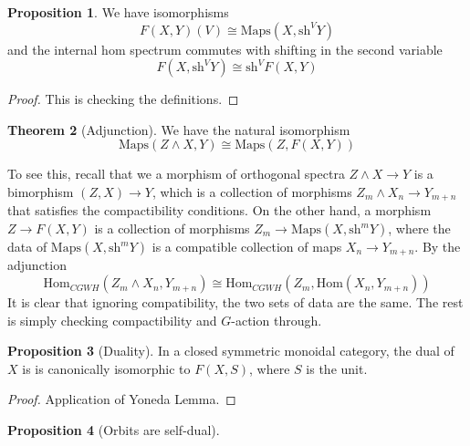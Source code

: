 \documentclass{article}
\theoremstyle{definition}
\newtheorem{theorem}{Theorem}[section] %
\newtheorem{proposition}[theorem]{Proposition}
\begin{document}
\begin{tcolorbox}[colback=blue!5!white,colframe=blue!30!white]
\begin{proposition}
We have isomorphisms 
\[F(X,Y)(V)\cong \textrm{Maps}(X, \textrm{sh}^VY)\]
and the internal hom spectrum commutes with shifting in the second variable
\[F(X,\textrm{sh}^VY)\cong \textrm{sh}^VF(X,Y)\]
\end{proposition}
\end{tcolorbox}
\begin{proof}
    This is checking the definitions.
\end{proof}


\begin{tcolorbox}[colback=red!5!white,colframe=red!30!white]
\begin{theorem}[Adjunction]
We have the natural isomorphism
\[\textrm{Maps}(Z\wedge X,Y)\cong \textrm{Maps}(Z, F(X,Y))\]
\end{theorem}
\end{tcolorbox}
To see this, recall that we a morphism of orthogonal spectra $Z\wedge X\to Y$ is a bimorphism $(Z,X)\to Y$, which is a collection of morphisms $Z_m\wedge X_n\to Y_{m+n}$ that satisfies the compactibility conditions. On the other hand, a morphism $Z\to F(X,Y)$ is a collection of morphisms $Z_m\to \textrm{Maps}(X,\textrm{sh}^mY)$, where the data of $\textrm{Maps}(X,\textrm{sh}^mY)$ is a compatible collection of maps $X_n\to Y_{m+n}$. By the adjunction $$\textrm{Hom}_{CGWH}(Z_m\wedge X_n,Y_{m+n})\cong \textrm{Hom}_{CGWH}(Z_m, \textrm{Hom}(X_n,Y_{m+n}))$$
It is clear that ignoring compatibility, the two sets of data are the same. The rest is simply checking compactibility and $G$-action through. 



\begin{tcolorbox}[colback=blue!5!white,colframe=blue!30!white]
\begin{proposition}[Duality]
In a closed symmetric monoidal category, the dual of $X$ is is canonically isomorphic to $F(X,S)$, where $S$ is the unit. 
\end{proposition}
\end{tcolorbox}
\begin{proof}
    Application of Yoneda Lemma.
\end{proof}


\begin{tcolorbox}[colback=blue!5!white,colframe=blue!30!white]
\begin{proposition}[Orbits are self-dual]

\end{proposition}
\end{tcolorbox}
\end{document}
